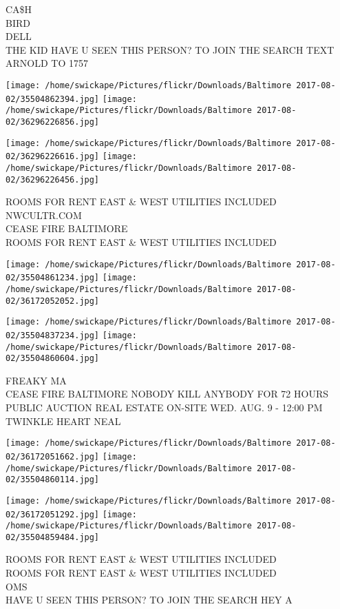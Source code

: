 \documentclass[10pt,letterpaper]{article}
\begin{document}
CA\$H\\
BIRD\\
DELL\\
THE KID HAVE U SEEN THIS PERSON?  TO JOIN THE SEARCH TEXT ARNOLD TO 1757
\pagebreak

\texttt{[image: /home/swickape/Pictures/flickr/Downloads/Baltimore 2017-08-02/35504862394.jpg]}
\texttt{[image: /home/swickape/Pictures/flickr/Downloads/Baltimore 2017-08-02/36296226856.jpg]}

\texttt{[image: /home/swickape/Pictures/flickr/Downloads/Baltimore 2017-08-02/36296226616.jpg]}
\texttt{[image: /home/swickape/Pictures/flickr/Downloads/Baltimore 2017-08-02/36296226456.jpg]}

ROOMS FOR RENT EAST \& WEST UTILITIES INCLUDED\\
NWCULTR.COM\\
CEASE FIRE BALTIMORE\\
ROOMS FOR RENT EAST \& WEST UTILITIES INCLUDED
\pagebreak

\texttt{[image: /home/swickape/Pictures/flickr/Downloads/Baltimore 2017-08-02/35504861234.jpg]}
\texttt{[image: /home/swickape/Pictures/flickr/Downloads/Baltimore 2017-08-02/36172052052.jpg]}

\texttt{[image: /home/swickape/Pictures/flickr/Downloads/Baltimore 2017-08-02/35504837234.jpg]}
\texttt{[image: /home/swickape/Pictures/flickr/Downloads/Baltimore 2017-08-02/35504860604.jpg]}

FREAKY MA\\
CEASE FIRE BALTIMORE NOBODY KILL ANYBODY FOR 72 HOURS\\
PUBLIC AUCTION REAL ESTATE ON{-}SITE WED. AUG. 9 {-} 12:00 PM\\
TWINKLE HEART NEAL
\pagebreak

\texttt{[image: /home/swickape/Pictures/flickr/Downloads/Baltimore 2017-08-02/36172051662.jpg]}
\texttt{[image: /home/swickape/Pictures/flickr/Downloads/Baltimore 2017-08-02/35504860114.jpg]}

\texttt{[image: /home/swickape/Pictures/flickr/Downloads/Baltimore 2017-08-02/36172051292.jpg]}
\texttt{[image: /home/swickape/Pictures/flickr/Downloads/Baltimore 2017-08-02/35504859484.jpg]}

ROOMS FOR RENT EAST \& WEST UTILITIES INCLUDED\\
ROOMS FOR RENT EAST \& WEST UTILITIES INCLUDED\\
OMS\\
HAVE U SEEN THIS PERSON?  TO JOIN THE SEARCH HEY A
\pagebreak
\end{document}
